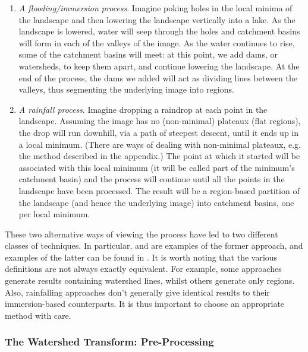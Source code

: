 \begin{enumerate}

\item \emph{A flooding/immersion process}. Imagine poking holes in the local minima of the landscape and then lowering the landscape vertically into a lake. As the landscape is lowered, water will seep through the holes and catchment basins will form in each of the valleys of the image. As the water continues to rise, some of the catchment basins will meet: at this point, we add dams, or watersheds, to keep them apart, and continue lowering the landscape. At the end of the process, the dams we added will act as dividing lines between the valleys, thus segmenting the underlying image into regions.

\item \emph{A rainfall process}. Imagine dropping a raindrop at each point in the landscape. Assuming the image has no (non-minimal) plateaux (flat regions), the drop will run downhill, via a path of steepest descent, until it ends up in a local minimum. (There are ways of dealing with non-minimal plateaux, e.g. the method described in the appendix.) The point at which it started will be associated with this local minimum (it will be called part of the minimum's catchment basin) and the process will continue until all the points in the landscape have been processed. The result will be a region-based partition of the landscape (and hence the underlying image) into catchment basins, one per local minimum.

\end{enumerate}

These two alternative ways of viewing the process have led to two different classes of techniques. In particular, \cite{bieniek00} and \cite{rambabu07} are examples of the former approach, and examples of the latter can be found in \cite{meijster98,osma-ruiz06,stoev00}. It is worth noting that the various definitions are not always exactly equivalent. For example, some approaches generate results containing watershed lines, whilst others generate only regions. Also, rainfalling approaches don't generally give identical results to their immersion-based counterparts. It is thus important to choose an appropriate method with care.

\subsubsection*{The Watershed Transform: Pre-Processing}

